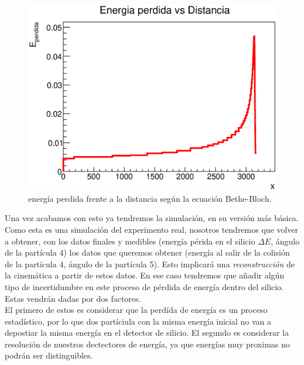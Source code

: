 \documentclass[12pt,a4paper]{article}
\numberwithin{equation}{section}
\numberwithin{figure}{section}
\begin{document}
\begin{enumerate}
    \begin{figure}[h!] \centering
        \includegraphics[scale=0.7]{srim.eps}
        \caption{energía perdida frente a la distancia según la ecuación Bethe-Bloch.}
        \label{Fig:energia_perdida}
    \end{figure}

\end{enumerate}

Una vez acabamos con esto ya tendremos la simulación, en su versión más básica. Como esta es una simulación del experimento real, nosotros tendremos que volver a obtener, con los datos finales y medibles (energía périda en el silicio $\Delta E$, ángulo de la partícula 4) los datos que queremos obtener (energía al salir de la colisión de la partícula 4, ángulo de la partícula 5). Esto implicará una {\it reconstrucción} de la cinemática a partir de estos datos. En ese caso tendremos que añadir algún tipo de incertidumbre en este proceso de pérdida de energía dentro del silicio. Estas vendrán dadas por dos factores. \\


El primero de estos es considerar que la perdída de energía es un proceso estadístico, por lo que dos partíciula con la misma energía inicial no van a depostiar la misma energía en el detector de silicio. El segundo es considerar la resolución de nuestros dectectores de energía, ya que energías muy proximas no podrán ser distinguibles. 
\end{document}
